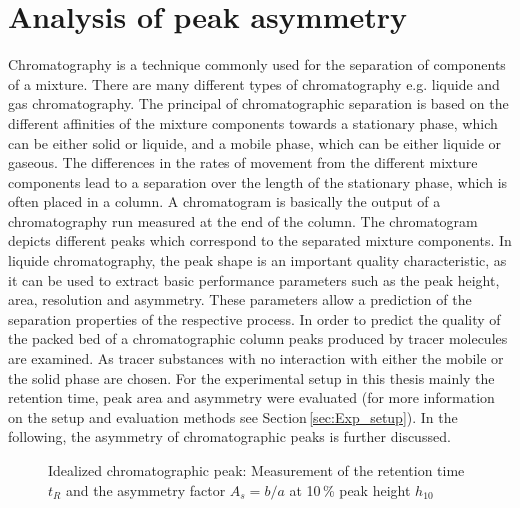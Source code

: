 \section{Analysis of peak asymmetry}
\label{sec:peak_as}
Chromatography is a technique commonly used for the separation of components of a mixture. There are many different types of chromatography e.g. liquide and gas chromatography. The principal of chromatographic separation is based on the different affinities of the mixture components towards a stationary phase, which can be either solid or liquide, and a mobile phase, which can be either liquide or gaseous. The differences in the rates of movement from the different mixture components lead to a separation over the length of the stationary phase, which is often placed in a column. A chromatogram is basically the output of a chromatography run measured at the end of the column. The chromatogram depicts different peaks which correspond to the separated mixture components. In liquide chromatography, the peak shape is an important quality characteristic, as it can be used to extract basic performance parameters such as the peak height, area, resolution and asymmetry. These parameters allow a prediction of the separation properties of the respective process. In order to predict the quality of the packed bed of a chromatographic column peaks produced by tracer molecules are examined. As tracer substances with no interaction with either the mobile or the solid phase are chosen. For the experimental setup in this thesis mainly the retention time, peak area and asymmetry were evaluated (for more information on the setup and evaluation methods see Section\,\ref{sec:Exp_setup}). In the following, the asymmetry of chromatographic peaks is further discussed. 

\begin{figure}
\centering
{}
\caption[Idealized chromatographic peak]{Idealized chromatographic peak: Measurement of the retention time $t_{R}$ and the asymmetry factor $A_{s}=b/a$ at 10\,\% peak height $h_{10}$ 
\label{fig:peak_param}
}
\end{figure} 

